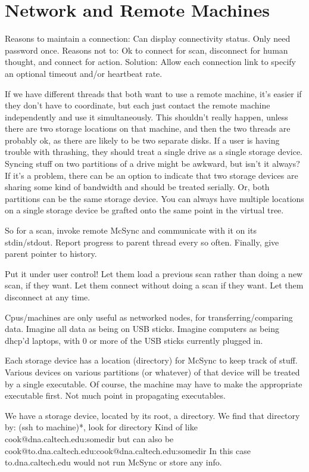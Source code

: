 \documentclass{book}
\begin{document}
\section{Network and Remote Machines}

Reasons to maintain a connection:  Can display connectivity status.  Only need password once.
Reasons not to:  Ok to connect for scan, disconnect for human thought, and connect for action.
Solution:  Allow each connection link to specify an optional timeout and/or heartbeat rate.

If we have different threads that both want to use a remote machine, it's easier if they don't have to coordinate, but each just contact the remote machine independently and use it simultaneously.
This shouldn't really happen, unless there are two storage locations on that machine, and then the two threads are probably ok, as there are likely to be two separate disks.  If a user is having trouble with thrashing, they should treat a single drive as a single storage device.  Syncing stuff on two partitions of a drive might be awkward, but isn't it always?  If it's a problem, there can be an option to indicate that two storage devices are sharing some kind of bandwidth and should be treated serially.  Or, both partitions can be the same storage device.  You can always have multiple locations on a single storage device be grafted onto the same point in the virtual tree.

So for a scan, invoke remote McSync and communicate with it on its stdin/stdout.  Report progress to parent thread every so often.  Finally, give parent pointer to history.

Put it under user control!  Let them load a previous scan rather than doing a new scan, if they want.  Let them connect without doing a scan if they want.  Let them disconnect at any time.

Cpus/machines are only useful as networked nodes, for transferring/comparing data.
Imagine all data as being on USB sticks.  Imagine computers as being dhcp'd laptops, with 0 or more of the USB sticks currently plugged in.

Each storage device has a location (directory) for McSync to keep track of stuff.
Various devices on various partitions (or whatever) of that device will be treated by a single executable.  Of course, the machine may have to make the appropriate executable first.  Not much point in propagating executables.

We have a storage device, located by its root, a directory.
We find that directory by: (ssh to machine)*, look for directory
Kind of like cook@dna.caltech.edu:somedir but can also be
cook@to.dna.caltech.edu:cook@dna.caltech.edu:somedir
In this case to.dna.caltech.edu would not run McSync or store any info.
\end{document}
